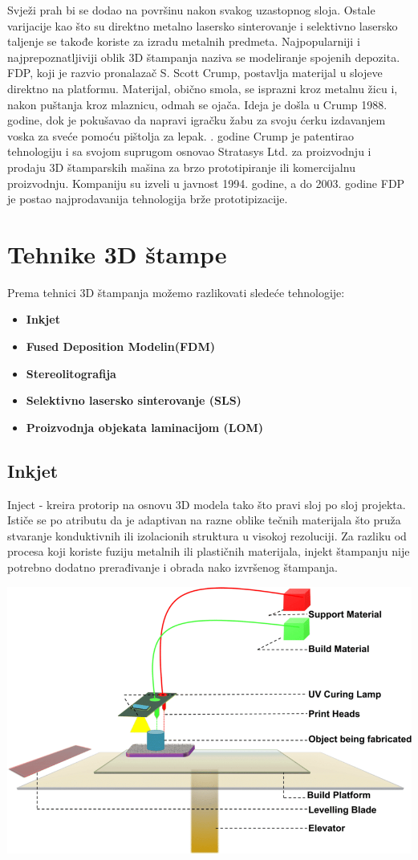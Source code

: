 \documentclass[a4paper]{article}
\begin{document}
{\bigbreak Svježi prah bi se dodao na površinu nakon svakog uzastopnog sloja. Ostale varijacije kao što su direktno metalno lasersko sinterovanje i selektivno lasersko taljenje se takođe koriste za izradu metalnih predmeta. 
\bigbreak Najpopularniji i najprepoznatljiviji oblik 3D štampanja naziva se modeliranje spojenih depozita. FDP, koji je razvio pronalazač S. Scott Crump, postavlja materijal u slojeve direktno na platformu. Materijal, obično smola, se isprazni kroz metalnu žicu i, nakon puštanja kroz mlaznicu, odmah se ojača. Ideja je došla u Crump 1988. godine, dok je pokušavao da napravi igračku žabu za svoju ćerku izdavanjem voska za sveće pomoću pištolja za lepak. 
. godine Crump je patentirao tehnologiju i sa svojom suprugom osnovao Stratasys Ltd. za proizvodnju i prodaju 3D štamparskih mašina za brzo prototipiranje ili komercijalnu proizvodnju. 
Kompaniju su izveli u javnost 1994. godine, a do 2003. godine FDP je postao najprodavanija tehnologija brže prototipizacije. 

\section{Tehnike 3D štampe}
\label{sec:naslov1}
Prema tehnici 3D štampanja možemo razlikovati sledeće tehnologije:
\begin{itemize}
\item \textbf{Inkjet}
\item \textbf{Fused Deposition Modelin(FDM)}
\item \textbf{Stereolitografija}
\item \textbf{Selektivno lasersko sinterovanje (SLS)}
\item \textbf{Proizvodnja objekata laminacijom (LOM)}
\end{itemize} 



 


\subsection{Inkjet}
\label{subsec:podnaslov1}
Inject - kreira protorip na osnovu 3D modela tako što pravi sloj po sloj projekta.
\bigbreak Ističe se po atributu da je adaptivan na razne oblike tečnih materijala što pruža stvaranje konduktivnih ili izolacionih struktura u visokoj rezoluciji. 
\bigbreak Za razliku od procesa koji koriste fuziju metalnih ili plastičnih materijala, injekt štampanju nije potrebno dodatno prerađivanje i obrada nako izvršenog štampanja.
\begin{center}
\includegraphics[width=.5\textwidth ]{Tehnikeslike/Inject.png}
\end{center}

}
\end{document}
